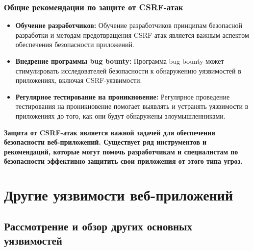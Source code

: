 \documentclass[a4paper,12pt]{diplom}
\begin{document}
	 \subsection{Общие рекомендации по защите от CSRF-атак}
	 
	 \begin{itemize}
	 \item \textbf{Обучение разработчиков:}  Обучение разработчиков принципам безопасной разработки и методам предотвращения CSRF-атак является важным аспектом обеспечения безопасности приложений.
	 \item \textbf{Внедрение программы bug bounty:}  Программа bug bounty может стимулировать исследователей безопасности к обнаружению уязвимостей в приложениях, включая CSRF-уязвимости. 
	 \item \textbf{Регулярное тестирование на проникновение:}  Регулярное проведение тестирования на проникновение помогает выявлять и устранять уязвимости в приложениях до того, как они будут обнаружены злоумышленниками.
	\end{itemize}
	 
	 \textbf{Защита от CSRF-атак является важной задачей для обеспечения безопасности веб-приложений. Существует ряд инструментов и рекомендаций, которые могут помочь разработчикам и специалистам по безопасности эффективно защитить свои приложения от этого типа угроз.}
	 
	 
	 
	 
	 
	 
	 
	 
	 
	 
	 
	 
	 
	 
	 
	 
	 
	 
	 
	 
	 
	 
	 
	 
	 
	 
	 
	 
	 
	 
	 \chapter[Другие уязвимости веб-приложений]{Другие уязвимости веб-приложений}
	 
	 
	 
	 
	 \section{Рассмотрение и обзор других основных уязвимостей}
	 
\end{document}
